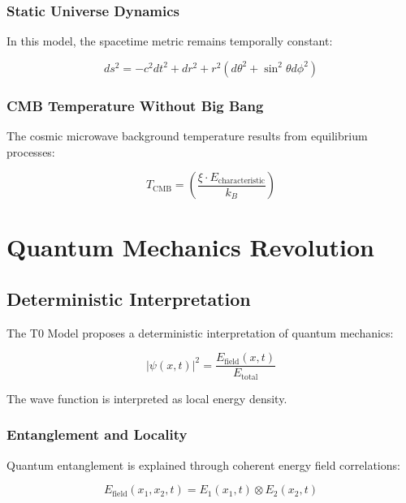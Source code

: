 	\subsection{Static Universe Dynamics}
	
	In this model, the spacetime metric remains temporally constant:
	
	\begin{equation}
		ds^2 = -c^2 dt^2 + dr^2 + r^2(d\theta^2 + \sin^2\theta d\phi^2)
	\end{equation}
	
	\subsection{CMB Temperature Without Big Bang}
	
	The cosmic microwave background temperature results from equilibrium processes:
	
	\begin{equation}
		T_{\text{CMB}} = \left(\frac{\xi \cdot E_{\text{characteristic}}}{k_B}\right)
	\end{equation}
	
	\chapter{Quantum Mechanics Revolution}
	
	\section{Deterministic Interpretation}
	
	The T0 Model proposes a deterministic interpretation of quantum mechanics:
	
	\begin{equation}
		|\psi(x,t)|^2 = \frac{E_{\text{field}}(x,t)}{E_{\text{total}}}
	\end{equation}
	
	The wave function is interpreted as local energy density.
	
	\subsection{Entanglement and Locality}
	
	Quantum entanglement is explained through coherent energy field correlations:
	
	\begin{equation}
		E_{\text{field}}(x_1, x_2, t) = E_1(x_1,t) \otimes E_2(x_2,t)
	\end{equation}
	
